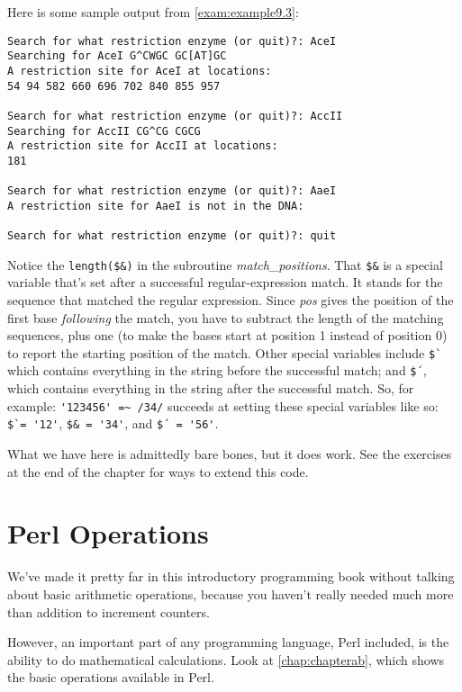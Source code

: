 

Here is some sample output from \autoref{exam:example9.3}:

\begin{lstlisting}
Search for what restriction enzyme (or quit)?: AceI
Searching for AceI G^CWGC GC[AT]GC
A restriction site for AceI at locations:
54 94 582 660 696 702 840 855 957

Search for what restriction enzyme (or quit)?: AccII
Searching for AccII CG^CG CGCG
A restriction site for AccII at locations:
181

Search for what restriction enzyme (or quit)?: AaeI
A restriction site for AaeI is not in the DNA:

Search for what restriction enzyme (or quit)?: quit
\end{lstlisting}

Notice the \verb|length($&)| in the subroutine \textit{match\_positions}. That \verb|$&| is a special variable that's set after a successful regular-expression match. It stands for the sequence that matched the regular expression. Since \textit{pos} gives the position of the first base \textit{following} the match, you have to subtract the length of the matching sequences, plus one (to make the bases start at position 1 instead of position 0) to report the starting position of the match. Other special variables include \verb|$`| which contains everything in the string before the successful match; and \verb|$´|, which contains everything in the string after the successful match. So, for example: \verb|'123456' =~ /34/| succeeds at setting these special variables like so: \verb|$`= '12'|, \verb|$& = '34'|, and \verb|$´ = '56'|.

What we have here is admittedly bare bones, but it does work. See the exercises at the end of the chapter for ways to extend this code. 

\section{Perl Operations}
We've made it pretty far in this introductory programming book without talking about basic arithmetic operations, because you haven't really needed much more than addition to increment counters.

However, an important part of any programming language, Perl included, is the ability to do mathematical calculations. Look at \autoref{chap:chapterab}, which shows the basic operations available in Perl. 

